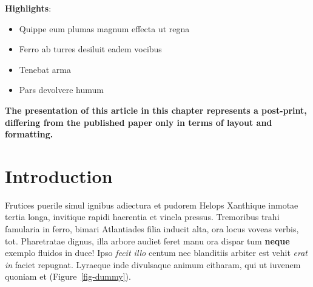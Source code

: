 \documentclass[
  a4paper,
  oneside]{ETH-thesis-template}
\begin{document}
\begin{tcolorbox}
\hfill\break
\textbf{Highlights}:

\begin{itemize}
  \item Quippe eum plumas magnum effecta ut regna
  \item Ferro ab turres desiluit eadem vocibus
  \item Tenebat arma
  \item Pars devolvere humum
\end{itemize}

\hfill\break
\textbf{The presentation of this article in this chapter represents a
post-print, differing from the published paper only in terms of layout
and formatting.}

\end{tcolorbox}

\newpage

\section{Introduction}\label{sec-introduction}

Frutices puerile simul ignibus adiectura et pudorem Helops Xanthique
inmotae tertia longa, invitique rapidi haerentia et vincla pressus.
Tremoribus trahi famularia in ferro, bimari Atlantiades filia inducit
alta, ora locus voveas verbis, tot. Pharetratae dignus, illa arbore
audiet feret manu ora dispar tum \textbf{neque} exemplo fluidos in duce!
Ipso \emph{fecit illo} centum nec blanditiis arbiter est vehit
\emph{erat in} faciet repugnat. Lyraeque inde divulsaque animum
citharam, qui ut iuvenem quoniam et (Figure~\ref{fig-dummy}).
\end{document}
